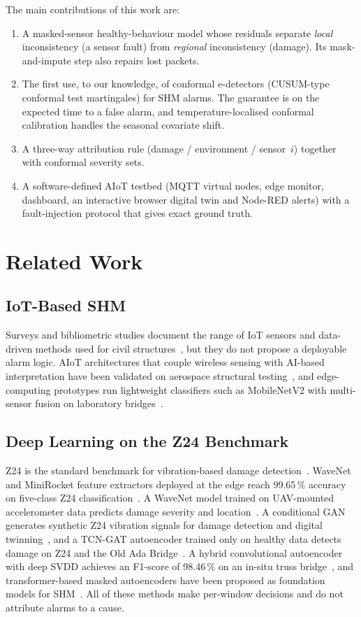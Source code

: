 \documentclass[conference]{IEEEtran}
\begin{document}
The main contributions of this work are:
\begin{enumerate}
\item A masked-sensor healthy-behaviour model whose residuals separate \emph{local} inconsistency (a sensor fault) from \emph{regional} inconsistency (damage). Its mask-and-impute step also repairs lost packets.
\item The first use, to our knowledge, of conformal e-detectors (CUSUM-type conformal test martingales) for SHM alarms. The guarantee is on the expected time to a false alarm, and temperature-localised conformal calibration handles the seasonal covariate shift.
\item A three-way attribution rule (damage / environment / sensor~$i$) together with conformal severity sets.
\item A software-defined AIoT testbed (MQTT virtual nodes, edge monitor, dashboard, an interactive browser digital twin and Node-RED alerts) with a fault-injection protocol that gives exact ground truth.
\end{enumerate}

\section{Related Work}
\subsection{IoT-Based SHM}
Surveys and bibliometric studies document the range of IoT sensors and data-driven methods used for civil structures~\cite{deng2023,rahita2024,li2025,anjali2025}, but they do not propose a deployable alarm logic. AIoT architectures that couple wireless sensing with AI-based interpretation have been validated on aerospace structural testing~\cite{venegas2025}, and edge-computing prototypes run lightweight classifiers such as MobileNetV2 with multi-sensor fusion on laboratory bridges~\cite{wang2025}.

\subsection{Deep Learning on the Z24 Benchmark}
Z24 is the standard benchmark for vibration-based damage detection~\cite{z24}. WaveNet and MiniRocket feature extractors deployed at the edge reach 99.65\,\% accuracy on five-class Z24 classification~\cite{dabbous2024}. A WaveNet model trained on UAV-mounted accelerometer data predicts damage severity and location~\cite{turkomany2025}. A conditional GAN generates synthetic Z24 vibration signals for damage detection and digital twinning~\cite{impraimakis2025}, and a TCN-GAT autoencoder trained only on healthy data detects damage on Z24 and the Old Ada Bridge~\cite{ni2025}. A hybrid convolutional autoencoder with deep SVDD achieves an F1-score of 98.46\,\% on an in-situ truss bridge~\cite{park2025}, and transformer-based masked autoencoders have been proposed as foundation models for SHM~\cite{benfenati2024}. All of these methods make per-window decisions and do not attribute alarms to a cause.
\end{document}
